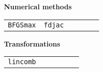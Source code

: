 \textbf{Numerical methods}
\hrulefill

\begin{tabular}{p{\cwid}p{\cwid}p{\cwid}p{\cwid}p{\cwid}p{\cwid}}
\texttt{BFGSmax} &
\texttt{fdjac} & & & & \\ [4pt]
\end{tabular}

\textbf{Transformations}
\hrulefill

\begin{tabular}{p{\cwid}p{\cwid}p{\cwid}p{\cwid}p{\cwid}p{\cwid}}
\texttt{lincomb} & & & & & \\ [4pt]
\end{tabular}

